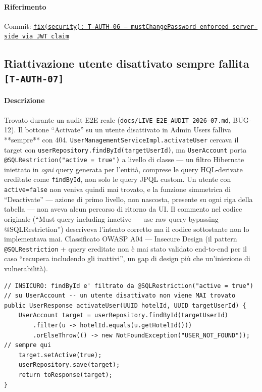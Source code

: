 ﻿\documentclass[a4paper,12pt]{report}
\newcommand{\commitref}[2]{\texttt{\small \href{https://github.com/diegoandruccioli/hotel-pms/commit/#1}{#2}}}
\newcommand{\threat}[1]{\texttt{\small\textcolor{vulnred}{[#1]}}}
\begin{document}
\paragraph{Riferimento} Commit: \commitref{a82ce14}{fix(security): T-AUTH-06 --- mustChangePassword enforced server-side via JWT claim}

\subsection{Riattivazione utente disattivato sempre fallita \threat{T-AUTH-07}}

\paragraph{Descrizione}
Trovato durante un audit E2E reale (\texttt{docs/LIVE\_E2E\_AUDIT\_2026-07.md},
BUG-12). Il bottone ``Activate'' su un utente disattivato in Admin Users falliva
**sempre** con 404. \texttt{UserManagementServiceImpl.activateUser} cercava il
target con \texttt{userRepository.findById(targetUserId)}, ma \texttt{UserAccount}
porta \texttt{@SQLRestriction("active = true")} a livello di classe --- un
filtro Hibernate iniettato in \emph{ogni} query generata per l'entità,
comprese le query HQL-derivate ereditate come \texttt{findById}, non solo le
query JPQL custom. Un utente con \texttt{active=false} non veniva quindi mai
trovato, e la funzione simmetrica di ``Deactivate'' --- azione di primo
livello, non nascosta, presente su ogni riga della tabella --- non aveva alcun
percorso di ritorno da UI. Il commento nel codice originale (``Must query
including inactive --- use raw query bypassing @SQLRestriction'') descriveva
l'intento corretto ma il codice sottostante non lo implementava mai.
Classificato OWASP A04 --- Insecure Design (il pattern
\texttt{@SQLRestriction} + query ereditate non è mai stato validato end-to-end
per il caso ``recupera includendo gli inattivi'', un gap di design più che
un'iniezione di vulnerabilità).

\begin{insecurebox}[title={Codice Vulnerabile --- UserManagementServiceImpl.java (baseline)}]
\begin{lstlisting}[style=java]
// INSICURO: findById e' filtrato da @SQLRestriction("active = true")
// su UserAccount -- un utente disattivato non viene MAI trovato
public UserResponse activateUser(UUID hotelId, UUID targetUserId) {
    UserAccount target = userRepository.findById(targetUserId)
        .filter(u -> hotelId.equals(u.getHotelId()))
        .orElseThrow(() -> new NotFoundException("USER_NOT_FOUND"));  // sempre qui
    target.setActive(true);
    userRepository.save(target);
    return toResponse(target);
}
\end{lstlisting}
\end{insecurebox}
\end{document}

